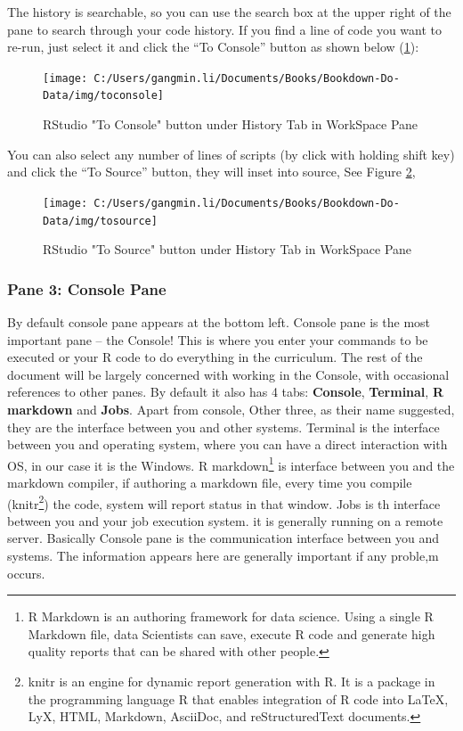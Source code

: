 \documentclass[
]{book}
\begin{document}
The history is searchable, so you can use the search box at the upper right of the pane to search through your code history. If you find a line of code you want to re-run, just select it and click the ``To Console'' button as shown below (\ref{fig:RStoconsole}):

\begin{figure}

{\centering \texttt{[image: C:/Users/gangmin.li/Documents/Books/Bookdown-Do-Data/img/toconsole]} 

}

\caption{RStudio "To Console" button under History Tab in WorkSpace Pane}\label{fig:RStoconsole}
\end{figure}

You can also select any number of lines of scripts (by click with holding shift key) and click the ``To Source'' button, they will inset into source, See Figure \ref{fig:tosource},

\begin{figure}

{\centering \texttt{[image: C:/Users/gangmin.li/Documents/Books/Bookdown-Do-Data/img/tosource]} 

}

\caption{RStudio "To Source" button under History Tab in WorkSpace Pane}\label{fig:tosource}
\end{figure}

\hypertarget{pane-3-console-pane}{%
\subsubsection*{Pane 3: Console Pane}\label{pane-3-console-pane}}


By default console pane appears at the bottom left. Console pane is the most important pane -- the Console! This is where you enter your commands to be executed or your R code to do everything in the curriculum. The rest of the document will be largely concerned with working in the Console, with occasional references to other panes.
By default it also has 4 tabs: \textbf{Console}, \textbf{Terminal}, \textbf{R markdown} and \textbf{Jobs}. Apart from console, Other three, as their name suggested, they are the interface between you and other systems. Terminal is the interface between you and operating system, where you can have a direct interaction with OS, in our case it is the Windows. R markdown\footnote{R Markdown is an authoring framework for data science. Using a single R Markdown file, data Scientists can save, execute R code and generate high quality reports that can be shared with other people.} is interface between you and the markdown compiler, if authoring a markdown file, every time you compile (knitr\footnote{knitr is an engine for dynamic report generation with R. It is a package in the programming language R that enables integration of R code into LaTeX, LyX, HTML, Markdown, AsciiDoc, and reStructuredText documents.}) the code, system will report status in that window. Jobs is th interface between you and your job execution system. it is generally running on a remote server.
Basically Console pane is the communication interface between you and systems. The information appears here are generally important if any proble,m occurs.
\end{document}
